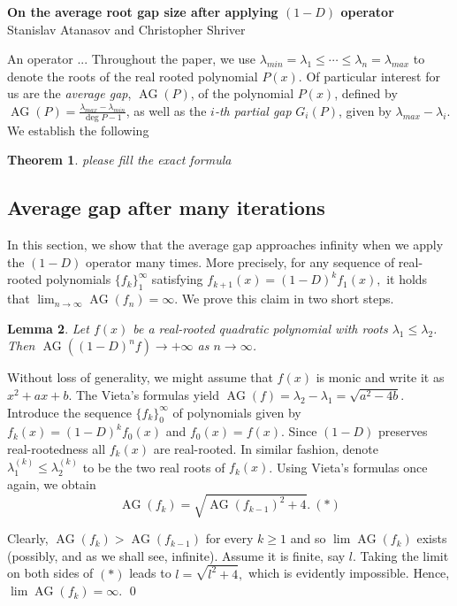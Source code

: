 \documentclass[11pt]{article}
\DeclareMathOperator{\AG}{AG}
\newtheorem{theorem}{Theorem}[section]
\newtheorem{lemma}[theorem]{Lemma}
\begin{document}
\begin{center}
\textbf{On the average root gap size after applying $(1-D)$ operator}\\
Stanislav Atanasov and Christopher Shriver
\end{center}

An operator ...
Throughout the paper, we use $\lambda_{min}=\lambda_1\leq \cdots \leq \lambda_n = \lambda_{max}$ to denote the roots of the real rooted polynomial $P(x)$. Of particular interest for us are the \emph{average gap}, $\AG(P)$, of the polynomial $P(x)$, defined by $\AG(P)=\frac{\lambda_{max} - \lambda_{min}}{\deg P - 1}$, as well as the \emph{$i$-th partial gap} $G_i(P)$, given by $\lambda_{max}-\lambda_i$. We establish the following

\begin{theorem}
please fill the exact formula
\end{theorem}

\subsection{Average gap after many iterations}
 In this section, we show that the average gap approaches infinity when we apply the $(1-D)$ operator many times. More precisely, for any sequence of real-rooted polynomials $\{f_k\}_1^{\infty}$ satisfying $f_{k+1}(x) = (1-D)^k f_{1}(x),$ it holds that $\lim_{n\to \infty} \AG(f_n) = \infty$. We prove this claim in two short steps.

 \begin{lemma}
 \label{degree two avg distance}
 Let $f(x)$ be a real-rooted quadratic polynomial with roots $\lambda_1 \leq \lambda_2$. Then $\AG((1-D)^n f) \to +\infty$ as ${n\to \infty}$.
 \end{lemma}
\proof
Without loss of generality, we might assume that $f(x)$ is monic and write it as $x^2+ax+b$. The Vieta's formulas yield $\AG(f) = \lambda_2 - \lambda_1 = \sqrt{a^2 - 4b}$. Introduce the sequence $\{f_k\}_{0}^\infty$ of polynomials given by $f_{k} (x)= (1-D)^k f_0(x)$ and $f_0(x) = f(x)$. Since $(1-D)$ preserves real-rootedness all $f_k(x)$ are real-rooted. In similar fashion, denote $\lambda_1^{(k)} \leq \lambda_2^{(k)}$ to be the two real roots of $f_k(x)$. Using Vieta's formulas once again, we obtain
 \[\AG(f_k) = \sqrt{\AG(f_{k-1})^2 + 4}.~(*)\]

 Clearly, $\AG(f_k) > \AG(f_{k-1})$ for every $k\ge 1$ and so  $\lim \AG(f_k)$ exists (possibly, and as we shall see, infinite). Assume it is finite, say $l$. Taking the limit on both sides of $(*)$ leads to $l = \sqrt{l^2 + 4},$ which is evidently impossible. Hence, $\lim \AG(f_k) = \infty$. \qed
\end{document}
